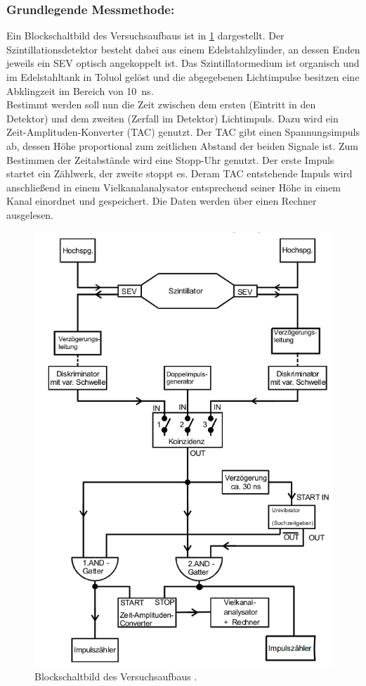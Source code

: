   \subsubsection{Grundlegende Messmethode:}
  	Ein Blockschaltbild des Versuchsaufbaus ist in \ref{fig:aufbau} dargestellt.
  	Der Szintillationsdetektor besteht dabei aus einem Edelstahlzylinder, an dessen
  	Enden jeweils ein SEV optisch angekoppelt ist. Das Szintillatormedium ist organisch
  	und im Edelstahltank in Toluol gelöst und die abgegebenen Lichtimpulse besitzen eine
  	Abklingzeit im Bereich von \SI{10}{\nano\second}.\\
  	Bestimmt werden soll nun die Zeit zwischen dem ersten (Eintritt in den
  	Detektor) und dem zweiten (Zerfall im Detektor) Lichtimpuls. Dazu wird ein
  	Zeit-Amplituden-Konverter (TAC) genutzt. Der TAC gibt einen Spannungsimpuls ab,
  	dessen Höhe proportional zum zeitlichen Abstand der
  	beiden Signale ist. Zum Bestimmen der Zeitabstände wird eine Stopp-Uhr genutzt.
    Der erste Impuls startet ein Zählwerk, der zweite stoppt es.
    Deram TAC entstehende Impuls wird anschließend in einem Vielkanalanalysator
  	entsprechend seiner Höhe in einem Kanal einordnet und gespeichert.
  	Die Daten werden über einen Rechner ausgelesen.
  	\begin{figure}
    	\centering
    	\includegraphics[width=\textwidth]{Bilder/AufbauB.png}
    	\caption{Blockschaltbild des Versuchsaufbaus \cite{anleitung}.}
    	\label{fig:aufbau}
  	\end{figure}
